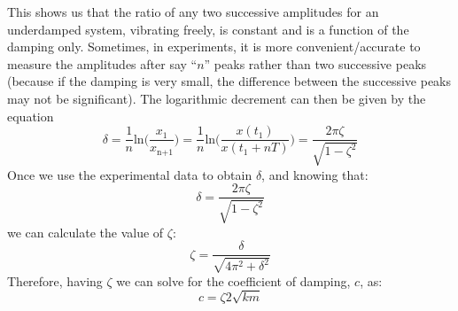 \documentclass[12pt,letter]{article}
\numberwithin{ex}{section} %
\numberwithin{re}{section} %
\numberwithin{equation}{section}	%
\begin{document}
			This shows us that the ratio of any two successive amplitudes for an underdamped system, vibrating freely, is constant and is a function of the damping only. Sometimes, in experiments, it is more convenient/accurate to measure the amplitudes after say ``$n$'' peaks rather than two successive peaks (because if the damping is very small, the difference between the successive
			peaks may not be significant). The logarithmic decrement can then be given by the equation
			\begin{equation}
				\delta = \frac{1}{n}\text{ln}\bigg(\frac{x_{\text{1}}}{x_{\text{n+1}}}\bigg) =   \frac{1}{n}\text{ln}\bigg(\frac{x(t_{\text{1}})}{x(t_{\text{1}}+nT)}\bigg) = \frac{2 \pi \zeta}{\sqrt{1-\zeta^2}}
			\end{equation}				
			Once we use the experimental data to obtain $\delta$, and knowing that:
			\begin{equation}
				\delta = \frac{2 \pi \zeta}{\sqrt{1-\zeta^2}}
			\end{equation}	
			we can calculate the value of $\zeta$:
			\begin{equation}
				\zeta = \frac{\delta}{\sqrt{4\pi^2+\delta^2}}
			\end{equation}
			Therefore, having $\zeta$ we can solve for the coefficient of damping, $c$, as: 
			\begin{equation}
				c = \zeta 2\sqrt{km}
			\end{equation}					
\end{document}
